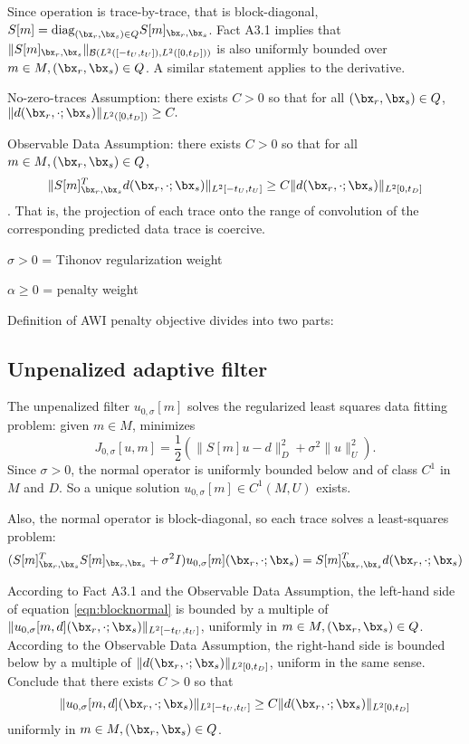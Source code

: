 Since operation is trace-by-trace, that is block-diagonal, $S[m] = \mbox{diag}_{(\bx_r,\bx_s) \in Q}S[m]_{\bx_r,\bx_s}$. Fact A3.1 implies that $\|S[m]_{\bx_r,\bx_s}\|_{{\cal B}(L^2([-t_U,t_U]),L^2([0,t_D]))}$ is also uniformly bounded over $m \in M, (\bx_r,\bx_s) \in Q$. A similar statement applies to the derivative.

No-zero-traces Assumption: there exists $C>0$ so that for all $(\bx_r,\bx_s) \in Q$,
$\|d(\bx_r,\cdot;\bx_s)\|_{L^2([0,t_D])} \ge C.$

Observable Data Assumption: there exists $C>0$ so that for all $m \in M, (\bx_r,\bx_s) \in Q$,
\begin{equation}
  \label{eqn:obsdata}
  \|S[m]_{\bx_r,\bx_s}^Td(\bx_r,\cdot;\bx_s)\|_{L^2[-t_U,t_U]} \ge C \|d(\bx_r,\cdot;\bx_s)\|_{L^2[0,t_D]}
\end{equation}.
That is, the projection of each trace onto the range of convolution of the corresponding predicted data trace is coercive.  

$\sigma > 0$ = Tihonov regularization weight

$\alpha \ge 0$ = penalty weight

Definition of AWI penalty objective divides into two parts:

\subsection{ Unpenalized adaptive filter}
The unpenalized filter $u_{0,\sigma}[m]$ solves the regularized least squares data fitting problem:  given $m \in M$, minimizes
\[
 J_{0,\sigma}[u,m] = \frac{1}{2}(\|S[m]u - d\|_D^2 + \sigma^2 \|u\|^2_U).
\]
Since $\sigma > 0$, the normal operator is uniformly bounded below and of class $C^1$ in $M$ and $D$. So a unique solution $u_{0,\sigma}[m] \in C^1(M, U)$ exists.

Also, the normal operator is block-diagonal, so each trace solves a least-squares problem:
\begin{equation}
  \label{eqn:blocknormal}
  (S[m]_{\bx_r,\bx_s}^TS[m]_{\bx_r,\bx_s} + \sigma^2 I)u_{0,\sigma}[m](\bx_r,\cdot; \bx_s)= S[m]_{\bx_r,\bx_s}^Td(\bx_r,\cdot;\bx_s)
\end{equation}

According to Fact A3.1 and the Observable Data Assumption, the left-hand side of equation \ref{eqn:blocknormal} is bounded by a multiple of $\|u_{0,\sigma}[m,d](\bx_r,\cdot; \bx_s)\|_{L^2[-t_U,t_U]}$, uniformly in $m \in M, (\bx_r,\bx_s) \in Q$. According to the Observable Data Assumption, the right-hand side is bounded below by a multiple of $\|d(\bx_r,\cdot;\bx_s)\|_{L^2[0,t_D]}$, uniform in the same sense. Conclude that there exists $C>0$ so that
\begin{equation}
  \label{eqn:u0lower}
  \|u_{0,\sigma}[m,d](\bx_r,\cdot; \bx_s)\|_{L^2[-t_U,t_U]} \ge C \|d(\bx_r,\cdot;\bx_s)\|_{L^2[0,t_D]}
\end{equation}
uniformly in $m \in M, (\bx_r,\bx_s) \in Q$.


